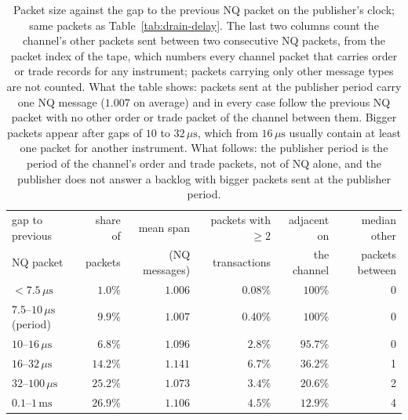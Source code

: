 \documentclass[11pt]{article}
\begin{document}
\begin{table}[H]
\centering
\small
\begin{tabular}{@{}l r r r r r@{}}
\toprule
gap to previous & share of & mean span & packets with $\ge 2$ & adjacent on & median other \\
NQ packet & packets & (NQ messages) & transactions & the channel & packets between \\
\midrule
$< 7.5\,\mu\mathrm{s}$             & $1.0\%$  & $1.006$ & $0.08\%$ & $100\%$  & 0 \\
$7.5$--$10\,\mu\mathrm{s}$ (period) & $9.9\%$  & $1.007$ & $0.40\%$ & $100\%$  & 0 \\
$10$--$16\,\mu\mathrm{s}$          & $6.8\%$  & $1.096$ & $2.8\%$  & $95.7\%$ & 0 \\
$16$--$32\,\mu\mathrm{s}$          & $14.2\%$ & $1.141$ & $6.7\%$  & $36.2\%$ & 1 \\
$32$--$100\,\mu\mathrm{s}$         & $25.2\%$ & $1.073$ & $3.4\%$  & $20.6\%$ & 2 \\
$0.1$--$1\,\mathrm{ms}$            & $26.9\%$ & $1.106$ & $4.5\%$  & $12.9\%$ & 4 \\
\bottomrule
\end{tabular}
\caption{Packet size against the gap to the previous NQ packet on the publisher's clock;
same packets as Table~\ref{tab:drain-delay}. The last two columns count the channel's
other packets sent between two consecutive NQ packets, from the packet index of the tape,
which numbers every channel packet that carries order or trade records for any
instrument; packets carrying only other message types are not counted. What the table shows: packets sent at the publisher period carry one NQ message
($1.007$ on average) and in every case follow the previous NQ packet with no other order or
trade packet of the channel between them. Bigger packets appear after gaps of $10$ to $32\,\mu\mathrm{s}$,
which from $16\,\mu\mathrm{s}$ usually contain at least one packet for another instrument.
What follows: the publisher period is the period of the channel's order and
trade packets, not of NQ alone, and the publisher does not answer a backlog with bigger packets sent at the
publisher period.}
\label{tab:drain-gap}
\end{table}
\end{document}
